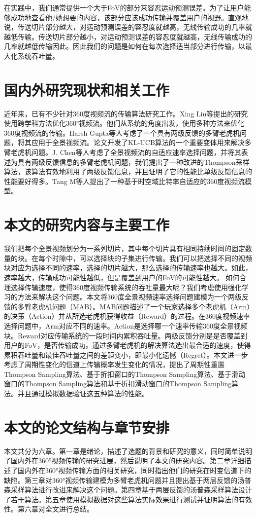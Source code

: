 在实践中，我们通常提供一个大于FoV的部分来容忍运动预测误差。为了让用户能够成功地查看他/她想要的内容，该部分应该成功传输并覆盖用户的视野。直观地说，传送切片部分越大，对运动预测误差的容忍度就越高，无线传输成功的几率就越低传输。传送切片部分越小，对运动预测误差的容忍度就越高，无线传输成功的几率就越低传输因此。因此我们的问题是如何在每次选择适当部分进行传输，以最大化系统吞吐量。
\label{sec:background}

\section{国内外研究现状和相关工作}
\label{sec:related_work}
近年来，已有不少针对360度视频流的传输算法研究工作。Xing Liu等\cite{ref2}提出的研究使用跨学科方法优化360°视频流。他们从系统的角度出发，使用多种方法来优化360度视频流的传输。Harsh Gupta等人\cite{ref3}考虑了一个具有两级反馈的多臂老虎机问题，将其应用于全景视频流。论文开发了KL-UCB算法的一个重要变体用来解决多臂老虎机问题。J. Chen等人\cite{ref4}考虑了全景视频流的自适应速率选择问题，并将其表述为具有两级反馈信息的多臂老虎机问题，我们提出了一种改进的Thompson采样算法，该算法有效地利用了两级反馈信息，并且证明了它的性能比单级反馈信息的性能要好得多。Tang M等人\cite{ref5}提出了一种基于时空域比特率自适应的360度视频流模型。

\section{本文的研究内容与主要工作}
我们把每个全景视频划分为一系列切片，其中每个切片具有相同持续时间的固定数量的块。在每个时隙中，可以选择块的子集进行传输。我们可以把选择不同的视频块对应为选择不同的速率，选择的切片越大，那么选择的传输速率也越大。如此，速率越大，传输成功可能性越低，但是覆盖到用户的FoV的可能性越大。
如何合理选择传输速度，使得360度视频传输系统的吞吐量最大呢？我们考虑使用强化学习的方法来解决这个问题。本文将360度全景视频速率选择问题建模为一个两级反馈的多臂老虎机问题（MAB）。MAB问题描述了一个玩家选择多个老虎机（Arm）的决策（Action）并从所选老虎机获得收益（Reward）的过程。在360度视频速率选择问题中，Arm对应不同的速率。Action是选择哪一个速率传输360度全景视频块。Reward对应传输系统的一段时间内累积吞吐量。两级反馈分别是是否覆盖到用户的FoV，是否传输成功。通过多臂老虎机的解决算法选出最合适的速度，使得累积吞吐量和最佳吞吐量之间的差距变小，即最小化遗憾（Regret）。本文进一步考虑了周期性变化的信道上传输概率发生变化的情况，提出了周期性重置Thompson Sampling算法、基于折扣窗口的Thompson Sampling算法、基于滑动窗口的Thompson Sampling算法和基于折扣滑动窗口的Thompson Sampling算法。并且通过模拟数据验证这五种算法的性能。

\section{本文的论文结构与章节安排}

\label{sec:arrangement}

本文共分为六章。第一章是绪论，描述了选题的背景和研究的意义，同时简单说明了国内外在360°视频传输的研究进展，然后说明了本文的研究内容。第二章详细描述了国内外在360°视频传输方面的相关研究，同时指出他们的研究在时变信道下的缺陷。第三章对360°视频传输建模为多臂老虎机问题并且提出基于两层反馈的汤普森采样算法进行改进来解决这个问题。第四章基于两层反馈的汤普森采样算法设计了若干算法。第五章使用模拟数据对这些算法实际效果进行测试并证明算法的有效性。第六章对全文进行总结。


